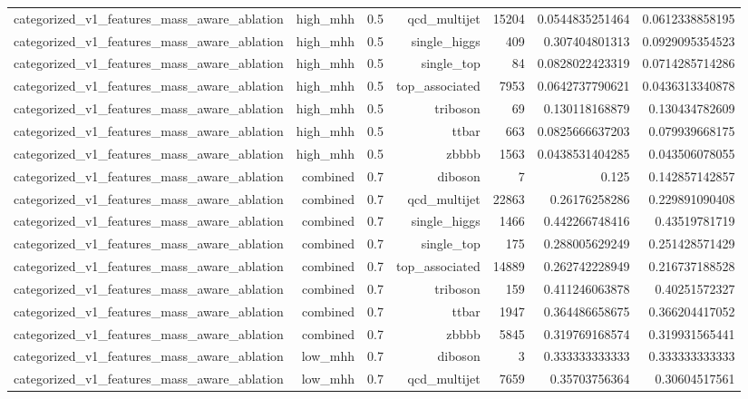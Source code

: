 \begin{table}[htbp]
{\begin{tabular}{lrrrrrr}
categorized\_v1\_features\_mass\_aware\_ablation & high\_mhh & 0.5 & qcd\_multijet & 15204 & 0.0544835251464 & 0.0612338858195 \\
categorized\_v1\_features\_mass\_aware\_ablation & high\_mhh & 0.5 & single\_higgs & 409 & 0.307404801313 & 0.0929095354523 \\
categorized\_v1\_features\_mass\_aware\_ablation & high\_mhh & 0.5 & single\_top & 84 & 0.0828022423319 & 0.0714285714286 \\
categorized\_v1\_features\_mass\_aware\_ablation & high\_mhh & 0.5 & top\_associated & 7953 & 0.0642737790621 & 0.0436313340878 \\
categorized\_v1\_features\_mass\_aware\_ablation & high\_mhh & 0.5 & triboson & 69 & 0.130118168879 & 0.130434782609 \\
categorized\_v1\_features\_mass\_aware\_ablation & high\_mhh & 0.5 & ttbar & 663 & 0.0825666637203 & 0.079939668175 \\
categorized\_v1\_features\_mass\_aware\_ablation & high\_mhh & 0.5 & zbbbb & 1563 & 0.0438531404285 & 0.043506078055 \\
categorized\_v1\_features\_mass\_aware\_ablation & combined & 0.7 & diboson & 7 & 0.125 & 0.142857142857 \\
categorized\_v1\_features\_mass\_aware\_ablation & combined & 0.7 & qcd\_multijet & 22863 & 0.26176258286 & 0.229891090408 \\
categorized\_v1\_features\_mass\_aware\_ablation & combined & 0.7 & single\_higgs & 1466 & 0.442266748416 & 0.43519781719 \\
categorized\_v1\_features\_mass\_aware\_ablation & combined & 0.7 & single\_top & 175 & 0.288005629249 & 0.251428571429 \\
categorized\_v1\_features\_mass\_aware\_ablation & combined & 0.7 & top\_associated & 14889 & 0.262742228949 & 0.216737188528 \\
categorized\_v1\_features\_mass\_aware\_ablation & combined & 0.7 & triboson & 159 & 0.411246063878 & 0.40251572327 \\
categorized\_v1\_features\_mass\_aware\_ablation & combined & 0.7 & ttbar & 1947 & 0.364486658675 & 0.366204417052 \\
categorized\_v1\_features\_mass\_aware\_ablation & combined & 0.7 & zbbbb & 5845 & 0.319769168574 & 0.319931565441 \\
categorized\_v1\_features\_mass\_aware\_ablation & low\_mhh & 0.7 & diboson & 3 & 0.333333333333 & 0.333333333333 \\
categorized\_v1\_features\_mass\_aware\_ablation & low\_mhh & 0.7 & qcd\_multijet & 7659 & 0.35703756364 & 0.30604517561 \\

\end{tabular}}
\end{table}
